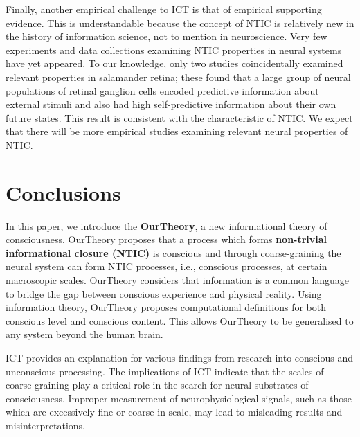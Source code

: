 \documentclass[utf8]{article}
\begin{document}
        Finally, another empirical challenge to ICT is that of empirical supporting evidence. This is understandable because the concept of NTIC is relatively new in the history of information science, not to mention in neuroscience. Very few experiments and data collections examining NTIC properties in neural systems have yet appeared. To our knowledge, only two studies \citep{Palmer2015, sederberg2018learning} coincidentally examined relevant properties in salamander retina; these found that a large group of neural populations of retinal ganglion cells encoded predictive information about external stimuli and also had high self-predictive information about their own future states. This result is consistent with the characteristic of NTIC. We expect that there will be more empirical studies examining relevant neural properties of NTIC.
        
    \section{Conclusions}
    In this paper, we introduce the \textbf{\acf{OurTheory}}, a new informational theory of consciousness. \ac{OurTheory} proposes that a process which forms \textbf{non-trivial informational closure (NTIC)} is conscious and through coarse-graining the neural system can form NTIC processes, i.e., conscious processes, at certain macroscopic scales. \ac{OurTheory} considers that information is a common language to bridge the gap between conscious experience and physical reality. Using information theory, \ac{OurTheory} proposes computational definitions for both conscious level and conscious content. This allows \ac{OurTheory} to be generalised to any system beyond the human brain. 
    
    ICT provides an explanation for various findings from research into conscious and unconscious processing. The implications of ICT indicate that the scales of coarse-graining play a critical role in the search for neural substrates of consciousness. Improper measurement of neurophysiological signals, such as those which are excessively fine or coarse in scale, may lead to misleading results and misinterpretations.
    
    
    
\end{document}
